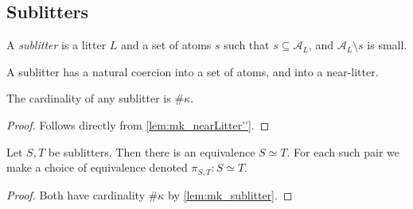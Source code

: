 \subsection{Sublitters}
\begin{definition}
    A \emph{sublitter} is a litter \( L \) and a set of atoms \( s \) such that \( s \subseteq \mathcal A_L \), and \( \mathcal A_L \setminus s \) is small.
\end{definition}
A sublitter has a natural coercion into a set of atoms, and into a near-litter.
\begin{lemma}
    \label{lem:mk_sublitter}
    The cardinality of any sublitter is \( \#\kappa \).
\end{lemma}
\begin{proof}
    Follows directly from \cref{lem:mk_nearLitter''}.
\end{proof}
\begin{lemma}
    \label{lem:Sublitter.equiv}
    Let \( S, T \) be sublitters.
    Then there is an equivalence \( S \simeq T \).
    For each such pair we make a choice of equivalence denoted \( \pi_{S, T} : S \simeq T \).
\end{lemma}
\begin{proof}
    Both have cardinality \( \#\kappa \) by \cref{lem:mk_sublitter}.
\end{proof}

